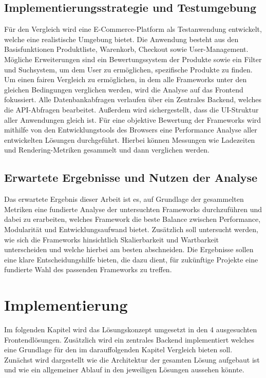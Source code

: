 \documentclass[oneside]{ausarbeitung}
\begin{document}
\section{Implementierungsstrategie und Testumgebung}

Für den Vergleich wird eine E-Commerce-Platform als Testanwendung entwickelt, welche eine realistische Umgebung bietet. Die Anwendung besteht aus den Basisfunktionen Produktliste, Warenkorb, Checkout sowie User-Management. Mögliche Erweiterungen sind ein Bewertungssystem der Produkte sowie ein Filter und Suchsystem, um dem User zu ermöglichen, spezifische Produkte zu finden. 
Um einen fairen Vergleich zu ermöglichen, in dem alle Frameworks unter den gleichen Bedingungen verglichen werden, wird die Analyse auf das Frontend fokussiert. Alle Datenbankabfragen verlaufen über ein Zentrales Backend, welches die API-Abfragen bearbeitet. 
Außerdem wird sichergestellt, dass die UI-Struktur aller Anwendungen gleich ist. 
Für eine objektive Bewertung der Frameworks wird mithilfe von den Entwicklungstools des Browsers eine Performance Analyse aller entwickelten Lösungen durchgeführt. Hierbei können Messungen wie Ladezeiten und Rendering-Metriken gesammelt und dann verglichen werden. 

\section{Erwartete Ergebnisse und Nutzen der Analyse}

Das erwartete Ergebnis dieser Arbeit ist es, auf Grundlage der gesammelten Metriken eine fundierte Analyse der untersuchten Frameworks durchzuführen und dabei zu erarbeiten, welches Framework die beste Balance zwischen Performance, Modularität und Entwicklungsaufwand bietet.
Zusätzlich soll untersucht werden, wie sich die Frameworks hinsichtlich Skalierbarkeit und Wartbarkeit unterscheiden und welche hierbei am besten abschneiden.
Die Ergebnisse sollen eine klare Entscheidungshilfe bieten, die dazu dient, für zukünftige Projekte eine fundierte Wahl des passenden Frameworks zu treffen.

\chapter{Implementierung}
\label{cha:implementierung}

Im folgenden Kapitel wird das Lösungskonzept umgesetzt in den 4 ausgesuchten Frontendlösungen. Zusätzlich wird ein zentrales Backend implementiert welches eine Grundlage für den im darauffolgenden Kapitel Vergleich bieten soll. Zunächst wird dargestellt wie die Architektur der gesamten Lösung aufgebaut ist und wie ein allgemeiner Ablauf in den jeweiligen Lösungen aussehen könnte. 
\end{document}
